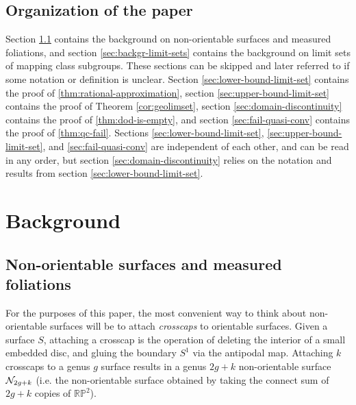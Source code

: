\documentclass[12pt, reqno]{amsart}
\begin{document}
\subsection*{Organization of the paper}
Section \ref{sec:backgr-meas-foli} contains the background on non-orientable surfaces and measured foliations, and section \ref{sec:backgr-limit-sets} contains the background on limit sets of mapping class subgroups.
These sections can be skipped and later referred to if some notation or definition is unclear.
Section \ref{sec:lower-bound-limit-set} contains the proof of \autoref{thm:rational-approximation}, section \ref{sec:upper-bound-limit-set} contains the proof of Theorem \ref{cor:geolimset}, section \ref{sec:domain-discontinuity} contains the proof of \autoref{thm:dod-is-empty}, and section \ref{sec:fail-quasi-conv} contains the proof of \autoref{thm:qc-fail}.
Sections \ref{sec:lower-bound-limit-set}, \ref{sec:upper-bound-limit-set}, and \ref{sec:fail-quasi-conv} are independent of each other, and can be read in any order, but section \ref{sec:domain-discontinuity} relies on the notation and results from section \ref{sec:lower-bound-limit-set}.


\section{Background}
\label{sec:background}

\subsection{Non-orientable surfaces and measured foliations}
\label{sec:backgr-meas-foli}

For the purposes of this paper, the most convenient way to think about non-orientable surfaces will be to attach \emph{crosscaps} to orientable surfaces.
Given a surface $S$, attaching a crosscap is the operation of deleting the interior of a small embedded disc, and gluing the boundary $S^1$ via the antipodal map.
Attaching $k$ crosscaps to a genus $g$ surface results in a genus $2g+k$ non-orientable surface $\mathcal{N}_{2g+k}$ (i.e. the non-orientable surface obtained by taking the connect sum of $2g+k$ copies of $\mathbb{RP}^2$).
\end{document}
